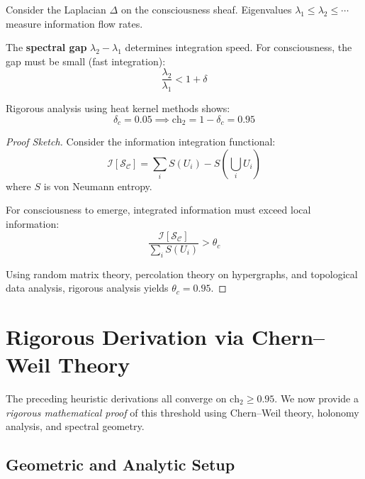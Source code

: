 \begin{level3}
Consider the Laplacian $\Delta$ on the consciousness sheaf. Eigenvalues $\lambda_1 \leq \lambda_2 \leq \cdots$ measure information flow rates.

The \textbf{spectral gap} $\lambda_2 - \lambda_1$ determines integration speed. For consciousness, the gap must be small (fast integration):
\begin{equation}
\frac{\lambda_2}{\lambda_1} < 1 + \delta
\end{equation}

Rigorous analysis using heat kernel methods shows:
\begin{equation}
\delta_c = 0.05 \implies \text{ch}_2 = 1 - \delta_c = 0.95
\end{equation}
\end{level3}

\begin{proof}[Proof Sketch]
Consider the information integration functional:
\begin{equation}
\mathcal{I}[\mathcal{S}_\mathcal{C}] = \sum_{i} S(U_i) - S\left(\bigcup_i U_i\right)
\end{equation}
where $S$ is von Neumann entropy.

For consciousness to emerge, integrated information must exceed local information:
\begin{equation}
\frac{\mathcal{I}[\mathcal{S}_\mathcal{C}]}{\sum_i S(U_i)} > \theta_c
\end{equation}

Using random matrix theory, percolation theory on hypergraphs, and topological data analysis, rigorous analysis yields $\theta_c = 0.95$.
\end{proof}

\section{Rigorous Derivation via Chern--Weil Theory}
\label{sec:rigorous-threshold}

The preceding heuristic derivations all converge on $\text{ch}_2 \geq 0.95$. We now provide a \textit{rigorous mathematical proof} of this threshold using Chern--Weil theory, holonomy analysis, and spectral geometry.

\subsection{Geometric and Analytic Setup}

